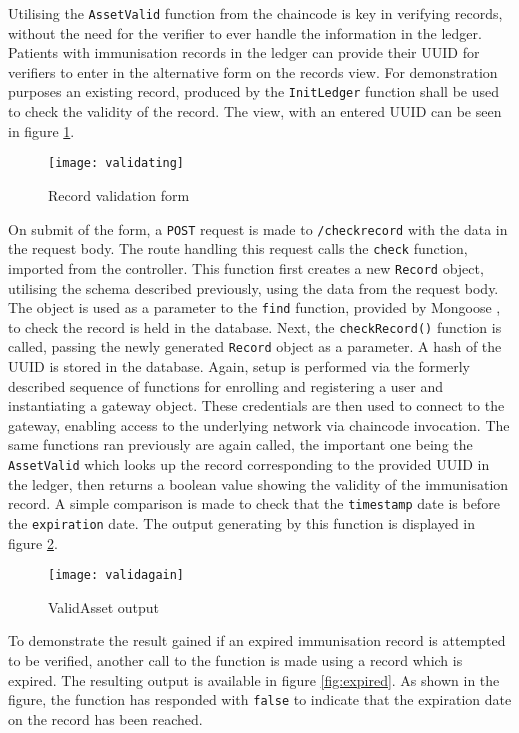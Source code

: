 Utilising the \lstinline{AssetValid} function from the chaincode is key in verifying records, without the need for the verifier to ever handle the information in the ledger.
Patients with immunisation records in the ledger can provide their UUID for verifiers to enter in the alternative form on the records view. 
For demonstration purposes an existing record, produced by the \lstinline{InitLedger} function shall be used to check the validity of the record. 
The view, with an entered UUID can be seen in figure \ref{fig:validating}.

\begin{figure}[H]
  \texttt{[image: validating]}
  \caption{Record validation form}
  \label{fig:validating}
\end{figure}

On submit of the form, a \lstinline{POST} request is made to \lstinline{/checkrecord} with the data in the request body. 
The route handling this request calls the \lstinline{check} function, imported from the controller.
This function first creates a new \lstinline{Record} object, utilising the schema described previously, using the data from the request body. 
The object is used as a parameter to the \lstinline{find} function, provided by Mongoose \cite{noauthor_mongoose_find}, to check the record is held in the database. 
Next, the \lstinline{checkRecord()} function is called, passing the newly generated \lstinline{Record} object as a parameter. 
A hash of the UUID is stored in the database.
Again, setup is performed via the formerly described sequence of functions for enrolling and registering a user and instantiating a gateway object. 
These credentials are then used to connect to the gateway, enabling access to the underlying network via chaincode invocation. 
The same functions ran previously are again called, the important one being the \lstinline{AssetValid} which looks up the record corresponding to the provided UUID in the ledger, then returns a boolean value showing the validity of the immunisation record. 
A simple comparison is made to check that the \lstinline{timestamp} date is before the \lstinline{expiration} date.
The output generating by this function is displayed in figure \ref{fig:validagain}.

\begin{figure}[H]
  \texttt{[image: validagain]}
  \caption{ValidAsset output}
  \label{fig:validagain}
\end{figure}

To demonstrate the result gained if an expired immunisation record is attempted to be verified, another call to the function is made using a record which is expired. 
The resulting output is available in figure \ref{fig:expired}. As shown in the figure, the function has responded with \lstinline{false} to indicate that the expiration date on the record has been reached.


